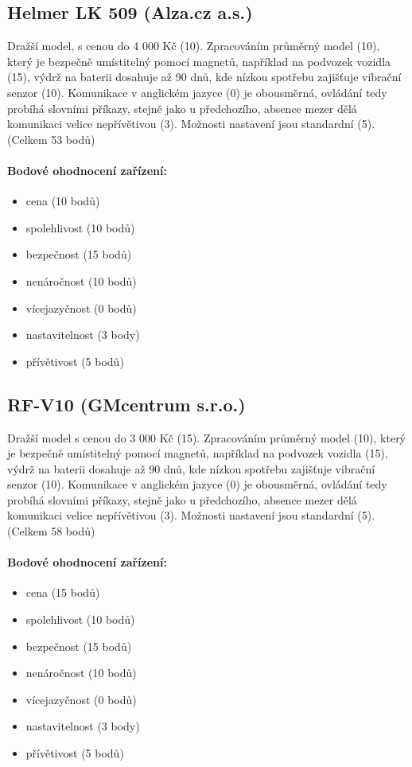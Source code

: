 \documentclass[FM,MP]{tulthesis}  %
\begin{document}
\subsection{Helmer LK 509 (Alza.cz a.s.)}
Dražší model, s cenou do 4 000 Kč (10). Zpracováním průměrný model (10), který je bezpečně umístitelný pomocí magnetů, například na podvozek vozidla (15), výdrž na baterii dosahuje až 90 dnů, kde nízkou spotřebu zajišťuje vibrační senzor (10). Komunikace v anglickém jazyce (0) je obousměrná, ovládání tedy probíhá slovními příkazy, stejně jako u předchozího, absence mezer dělá komunikaci velice nepřívětivou (3). Možnosti nastavení jsou standardní (5). (Celkem 53 bodů)

\paragraph{Bodové ohodnocení zařízení:}
\begin{itemize}
\item cena (10 bodů)
\item spolehlivost (10 bodů)
\item bezpečnost (15 bodů)
\item nenáročnost (10 bodů)
\item vícejazyčnost (0 bodů)
\item nastavitelnost (3 body)
\item přívětivost (5 bodů)
\end{itemize}

\subsection{RF-V10 (GMcentrum s.r.o.)}
Dražší model s cenou do 3 000 Kč (15). Zpracováním průměrný model (10), který je bezpečně umístitelný pomocí magnetů, například na podvozek vozidla (15), výdrž na baterii dosahuje až 90 dnů, kde nízkou spotřebu zajišťuje vibrační senzor (10). Komunikace v anglickém jazyce (0) je obousměrná, ovládání tedy probíhá slovními příkazy, stejně jako u předchozího, absence mezer dělá komunikaci velice nepřívětivou (3). Možnosti nastavení jsou standardní (5). (Celkem 58 bodů)

\paragraph{Bodové ohodnocení zařízení:}
\begin{itemize}
\item cena (15 bodů)
\item spolehlivost (10 bodů)
\item bezpečnost (15 bodů)
\item nenáročnost (10 bodů)
\item vícejazyčnost (0 bodů)
\item nastavitelnost (3 body)
\item přívětivost (5 bodů)
\end{itemize}
\end{document}
